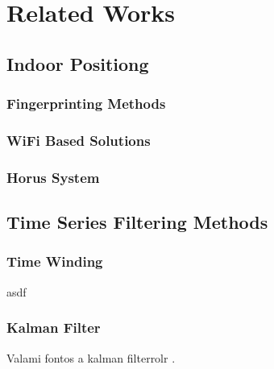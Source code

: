 \chapter{Related Works}
\label{chap:relatedWorks}

\section{Indoor Positiong}

\subsection{Fingerprinting Methods}

\subsection{WiFi Based Solutions}

\subsection{Horus System}

\section{Time Series Filtering Methods}
\subsection{Time Winding}


asdf \cite{camp2008ieee}


\subsection{Kalman Filter}

Valami fontos a kalman filterrolr \cite{wan2000unscented}.